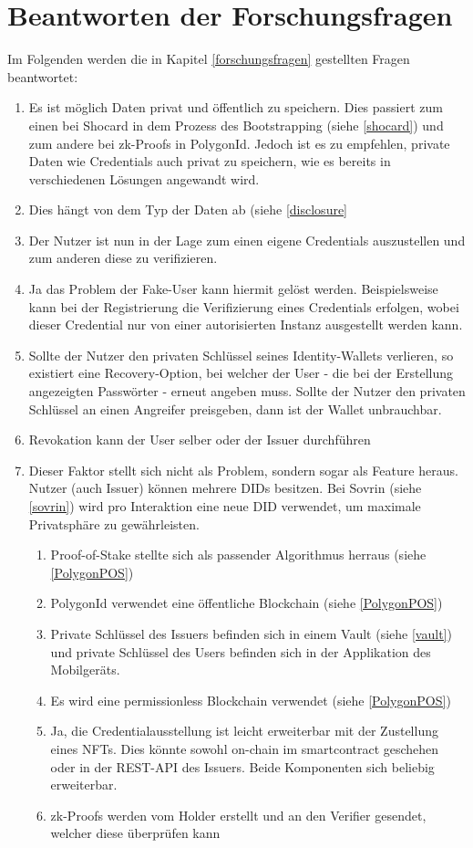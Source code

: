 \section{Beantworten der Forschungsfragen}
Im Folgenden werden die in Kapitel \ref{forschungsfragen} gestellten Fragen beantwortet:
\begin{enumerate}
	\item Es ist möglich Daten privat und öffentlich zu speichern. Dies passiert zum einen bei Shocard in dem Prozess des Bootstrapping (siehe \ref{shocard}) und zum andere bei zk-Proofs in PolygonId. Jedoch ist es zu empfehlen, private Daten wie Credentials auch privat zu speichern, wie es bereits in verschiedenen Lösungen angewandt wird.
	\item Dies hängt von dem Typ der Daten ab (siehe \ref{disclosure}
	\item Der Nutzer ist nun in der Lage zum einen eigene Credentials auszustellen und zum anderen diese zu verifizieren.
	\item Ja das Problem der Fake-User kann hiermit gelöst werden. Beispielsweise kann bei der Registrierung die Verifizierung eines Credentials erfolgen, wobei dieser Credential nur von einer autorisierten Instanz ausgestellt werden kann.
	\item Sollte der Nutzer den privaten Schlüssel seines Identity-Wallets verlieren, so existiert eine Recovery-Option, bei welcher der User - die bei der Erstellung angezeigten Passwörter - erneut angeben muss. Sollte der Nutzer den privaten Schlüssel an einen Angreifer preisgeben, dann ist der Wallet unbrauchbar.
	\item Revokation kann der User selber oder der Issuer durchführen
	\item Dieser Faktor stellt sich nicht als Problem, sondern sogar als Feature heraus. Nutzer (auch Issuer) können mehrere DIDs besitzen. Bei Sovrin (siehe \ref{sovrin}) wird pro Interaktion eine neue DID verwendet, um maximale Privatsphäre zu gewährleisten.
	\begin{enumerate}
		\item Proof-of-Stake stellte sich als passender Algorithmus herraus (siehe \ref{PolygonPOS})
		\item PolygonId verwendet eine öffentliche Blockchain (siehe \ref{PolygonPOS})
		\item Private Schlüssel des Issuers befinden sich in einem Vault (siehe \ref{vault}) und private Schlüssel des Users befinden sich in der Applikation des Mobilgeräts.
		\item Es wird eine permissionless Blockchain verwendet (siehe \ref{PolygonPOS})
		\item Ja, die Credentialausstellung ist leicht erweiterbar mit der Zustellung eines NFTs. Dies könnte sowohl on-chain im smartcontract geschehen oder in der REST-API des Issuers. Beide Komponenten sich beliebig erweiterbar.
		\item zk-Proofs werden vom Holder erstellt und an den Verifier gesendet, welcher diese überprüfen kann
	\end{enumerate}
\end{enumerate}

